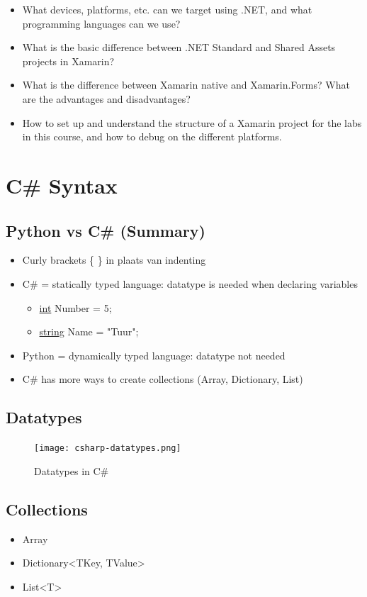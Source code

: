 \documentclass{article}
\begin{document}
\begin{itemize}
    \item What devices, platforms, etc. can we target using .NET, and what programming languages can we use?
    \item What is the basic difference between .NET Standard and Shared Assets projects in Xamarin?
    \item What is the difference between Xamarin native and Xamarin.Forms? What are the advantages and disadvantages?
    \item How to set up and understand the structure of a Xamarin project for the labs in this course, and how to debug on the different platforms.
\end{itemize}

\section{C\# Syntax}

\subsection{Python vs C\# (Summary)}

\begin{itemize}
    \item Curly brackets \{ \} in plaats van indenting
    \item C\# = statically typed language: datatype is needed when declaring variables
    \begin{itemize}
        \item \underline{int} Number = 5;
        \item \underline{string} Name = "Tuur";
    \end{itemize}
    \item Python = dynamically typed language: datatype not needed
    \item C\# has more ways to create collections (Array, Dictionary, List)
\end{itemize}

\subsection{Datatypes}
\begin{figure}[H]
    \centering
    \texttt{[image: csharp-datatypes.png]}
    \caption{Datatypes in C\#}
\end{figure}

\subsection{Collections}
\begin{itemize}
    \item Array
    \item Dictionary<TKey, TValue>
    \item List<T>
\end{itemize}
\end{document}

